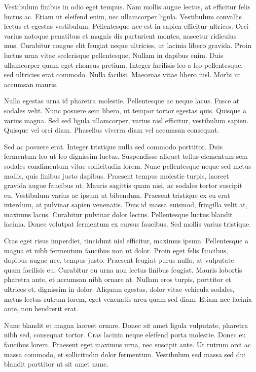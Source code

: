 Vestibulum finibus in odio eget tempus. Nam mollis augue lectus, at efficitur felis luctus ac. Etiam ut eleifend enim, nec ullamcorper ligula. Vestibulum convallis lectus et egestas vestibulum. Pellentesque nec est in sapien efficitur ultrices. Orci varius natoque penatibus et magnis dis parturient montes, nascetur ridiculus mus. Curabitur congue elit feugiat neque ultricies, ut lacinia libero gravida. Proin luctus urna vitae scelerisque pellentesque. Nullam in dapibus enim. Duis ullamcorper quam eget rhoncus pretium. Integer facilisis leo a leo pellentesque, sed ultricies erat commodo. Nulla facilisi. Maecenas vitae libero nisl. Morbi ut accumsan mauris.

Nulla egestas urna id pharetra molestie. Pellentesque ac neque lacus. Fusce at sodales velit. Nunc posuere sem libero, ut tempor tortor egestas quis. Quisque a varius magna. Sed sed ligula ullamcorper, varius nisl efficitur, vestibulum sapien. Quisque vel orci diam. Phasellus viverra diam vel accumsan consequat.

Sed ac posuere erat. Integer tristique nulla sed commodo porttitor. Duis fermentum leo ut leo dignissim luctus. Suspendisse aliquet tellus elementum sem sodales condimentum vitae sollicitudin lorem. Nunc pellentesque neque sed metus mollis, quis finibus justo dapibus. Praesent tempus molestie turpis, laoreet gravida augue faucibus ut. Mauris sagittis quam nisi, ac sodales tortor suscipit eu. Vestibulum varius ac ipsum ut bibendum. Praesent tristique ex eu erat interdum, at pulvinar sapien venenatis. Duis id massa euismod, fringilla velit at, maximus lacus. Curabitur pulvinar dolor lectus. Pellentesque luctus blandit lacinia. Donec volutpat fermentum ex cursus faucibus. Sed mollis varius tristique.

Cras eget risus imperdiet, tincidunt nisl efficitur, maximus ipsum. Pellentesque a magna et nibh fermentum faucibus non ut dolor. Proin eget felis faucibus, dapibus augue nec, tempus justo. Praesent feugiat purus nulla, at vulputate quam facilisis eu. Curabitur eu urna non lectus finibus feugiat. Mauris lobortis pharetra ante, et accumsan nibh ornare at. Nullam eros turpis, porttitor et ultrices et, dignissim in dolor. Aliquam egestas, dolor vitae vehicula sodales, metus lectus rutrum lorem, eget venenatis arcu quam sed diam. Etiam nec lacinia ante, non hendrerit erat.

Nunc blandit et magna laoreet ornare. Donec sit amet ligula vulputate, pharetra nibh sed, consequat tortor. Cras lacinia neque eleifend porta molestie. Donec eu faucibus lorem. Praesent eget maximus urna, nec suscipit ante. Ut rutrum orci ac massa commodo, et sollicitudin dolor fermentum. Vestibulum sed massa sed dui blandit porttitor ut sit amet nunc.

